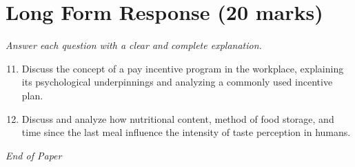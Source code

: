 \documentclass[12pt]{article}
\begin{document}
\section*{Long Form Response (20 marks)}
\textit{Answer each question with a clear and complete explanation.}
\begin{enumerate}[label=\arabic*.]
\setcounter{enumi}{10}
\item Discuss the concept of a pay incentive program in the workplace, explaining its psychological underpinnings and analyzing a commonly used incentive plan.
\item Discuss and analyze how nutritional content, method of food storage, and time since the last meal influence the intensity of taste perception in humans.
\end{enumerate}

\vfill
\noindent\textit{End of Paper}
\end{document}
